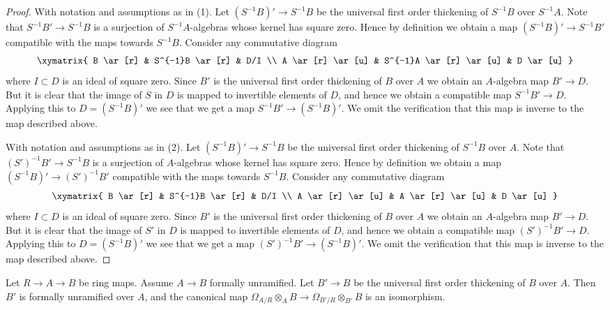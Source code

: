 \begin{proof}
With notation and assumptions as in (1). Let $(S^{-1}B)' \to S^{-1}B$
be the universal first order thickening of $S^{-1}B$ over $S^{-1}A$.
Note that $S^{-1}B' \to S^{-1}B$ is a surjection of $S^{-1}A$-algebras
whose kernel has square zero. Hence by definition we obtain a map
$(S^{-1}B)' \to S^{-1}B'$ compatible with the maps towards $S^{-1}B$.
Consider any commutative diagram
$$
\xymatrix{
B \ar[r] & S^{-1}B \ar[r] & D/I \\
A \ar[r] \ar[u] & S^{-1}A \ar[r] \ar[u] & D \ar[u]
}
$$
where $I \subset D$ is an ideal of square zero. Since $B'$ is the universal
first order thickening of $B$ over $A$ we obtain an $A$-algebra map
$B' \to D$. But it is clear that the image of $S$ in $D$ is mapped to
invertible elements of $D$, and hence we obtain a compatible map
$S^{-1}B' \to D$. Applying this to $D = (S^{-1}B)'$ we see that we get
a map $S^{-1}B' \to (S^{-1}B)'$. We omit the verification that this map
is inverse to the map described above.

\medskip\noindent
With notation and assumptions as in (2). Let $(S^{-1}B)' \to S^{-1}B$
be the universal first order thickening of $S^{-1}B$ over $A$.
Note that $(S')^{-1}B' \to S^{-1}B$ is a surjection of $A$-algebras
whose kernel has square zero. Hence by definition we obtain a map
$(S^{-1}B)' \to (S')^{-1}B'$ compatible with the maps towards $S^{-1}B$.
Consider any commutative diagram
$$
\xymatrix{
B \ar[r] & S^{-1}B \ar[r] & D/I \\
A \ar[r] \ar[u] & A \ar[r] \ar[u] & D \ar[u]
}
$$
where $I \subset D$ is an ideal of square zero. Since $B'$ is the universal
first order thickening of $B$ over $A$ we obtain an $A$-algebra map
$B' \to D$. But it is clear that the image of $S'$ in $D$ is mapped to
invertible elements of $D$, and hence we obtain a compatible map
$(S')^{-1}B' \to D$. Applying this to $D = (S^{-1}B)'$ we see that we get
a map $(S')^{-1}B' \to (S^{-1}B)'$. We omit the verification that this map
is inverse to the map described above.
\end{proof}

\begin{lemma}
\label{lemma-differentials-universal-thickening}
Let $R \to A  \to B$ be ring maps. Assume $A \to B$ formally unramified.
Let $B' \to B$ be the universal first order thickening of $B$ over $A$.
Then $B'$ is formally unramified over $A$, and the canonical map
$\Omega_{A/R} \otimes_A B \to \Omega_{B'/R} \otimes_{B'} B$ is an
isomorphism.
\end{lemma}

